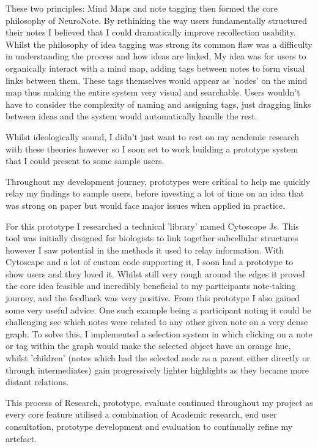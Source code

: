 These two principles: Mind Maps and note tagging then formed the core philosophy of NeuroNote. By rethinking the way users fundamentally structured their notes I believed that I could dramatically improve recollection usability. Whilst the philosophy of idea tagging was strong its common flaw was a difficulty in understanding the process and how ideas are linked, My idea was for users to organically interact with a mind map, adding tags between notes to form visual links between them. These tags themselves would appear as 'nodes' on the mind map thus making the entire system very visual and searchable. Users wouldn't have to consider the complexity of naming and assigning tags, just dragging links between ideas and the system would automatically handle the rest.

Whilst ideologically sound, I didn't just want to rest on my academic research with these theories however so I soon set to work building a prototype system that I could present to some sample users. 

Throughout my development journey, prototypes were critical to help me quickly relay my findings to sample users, before investing a lot of time on an idea that was strong on paper but would face major issues when applied in practice. 

For this prototype I researched a technical 'library' named Cytoscope Js. This tool was initially designed for biologists to link together subcellular structures however I saw potential in the methods it used to relay information. With Cytoscape and a lot of custom code supporting it, I soon had a prototype to show users and they loved it. Whilst still very rough around the edges it proved the core idea feasible and incredibly beneficial to my participants note-taking journey, and the feedback was very positive. From this prototype I also gained some very useful advice. One such example being a participant noting it could be challenging see which notes were related to any other given note on a very dense graph. To solve this, I implemented a selection system in which clicking on a note or tag within the graph would make the selected object have an orange hue, whilst 'children' (notes which had the selected node as a parent either directly or through intermediates) gain progressively lighter highlights as they became more distant relations.

This process of Research, prototype, evaluate continued throughout my project as every core feature utilised a combination of Academic research, end user consultation, prototype development and evaluation to continually refine my artefact. 

